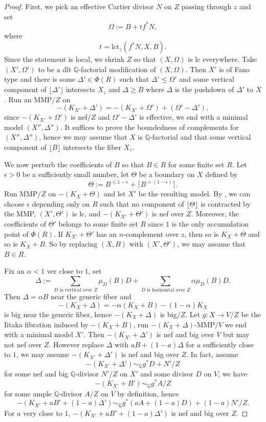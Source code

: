 \documentclass[letterpaper,reqno,12pt]{amsart}
\numberwithin{equation}{section}
\theoremstyle{plain}
\begin{document}
\begin{proof}
    First, we pick an effective Cartier divisor $N$ on $Z$ passing through $z$ and set \[\Omega:=B+tf^*N,\] where \[t=\text{lct}_z(f^*N,X,B).\]  Since the statement is local, we shrink $Z$ so that $(X,\Omega)$ is lc everywhere. Take $(X',\Omega')$ to be a dlt ${\mathbb Q}$-factorial modification of $(X,\Omega)$. Then $X'$ is of Fano type and there is some $\Delta'\in\Phi(R)$ such that $\Delta'\leq\Omega'$ and some vertical component of $\lfloor\Delta'\rfloor$ intersects $X_z$ and $\Delta\geq B$ where $\Delta$ is the pushdown of $\Delta'$ to $X$. Run an MMP$/Z$ on \[-(K_{X'}+\Delta')=-(K_{X'}+\Omega')+(\Omega'-\Delta'),\] since $-(K_{X'}+\Omega')$ is nef$/Z$ and $\Omega'-\Delta'$ is effective, we end with a minimal model $(X'',\Delta'')$. It suffices to prove the boundedness of complements for $(X'',\Delta'')$, hence we may assume that $X$ is ${\mathbb Q}$-factorial and that some vertical component of $\lfloor B\rfloor$ intersects the fiber $X_z$.
    
    We now perturb the coefficients of $B$ so that $B\in R$ for some finite set $R$. Let $\epsilon>0$ be a sufficiently small number, let $\Theta$ be a boundary on $X$ defined by
    \[\Theta:=B^{\leq 1-\epsilon}+\lceil B^{>(1-\epsilon)}\rceil.\]
    Run MMP$/Z$ on $-(K_X+\Theta)$ and let $X'$ be the resulting model. By , we can choose $\epsilon$ depending only on $R$ such that no component of $\lfloor\Theta\rfloor$ is contracted by the MMP, $(X',\Theta')$ is lc, and $-(K_{X'}+\Theta')$ is nef over $Z$. Moreover, the coefficients of $\Theta'$ belongs to some finite set $R$ since $1$ is the only accumulation point of $\Phi(R)$. If $K_{X'}+\Theta'$ has an $n$-complement over $z$, then so is $K_X+\Theta$ and so is $K_X+B$.  So by replacing $(X,B)$ with $(X',\Theta')$, we may assume that $B\in R$.  
    
    Fix an $\alpha<1$ ver close to $1$, set \[\Delta:=\sum
    \limits_{D\text{ is vertical over }Z}\mu_D(B)D+\sum\limits_{D\text{ is horizontal over }Z}\alpha\mu_D(B)D.\] Then $\Delta=\alpha B$ near the generic fiber and \[-(K_X+\Delta)=-\alpha(K_X+B)-(1-\alpha)K_X\] is big near the generic fiber, hence $-(K_X+\Delta)$ is big$/Z$. Let $g:X\to V/Z$ be the Iitaka fibration induced by $-(K_X+B)$, run $-(K_X+\Delta)$-MMP$/V$ we end with a minimal model $X'$. Then $-(K_{X'}+\Delta')$ is nef and big over $V$ but may not nef over $Z$. However replace $\Delta$ with $aB+(1-a)\Delta$ for $a$ sufficiently close to $1$, we may assume $-(K_{X'}+\Delta')$ is nef and big over $Z$. In fact, assume \[-(K_{X'}+\Delta')\sim_{\mathbb Q} g^*D+N'/Z\] for some nef and big ${\mathbb Q}$-divisor $N'/Z$ on $X'$ and some divisor $D$ on $V$, we have \[-(K_{X'}+B')\sim_{\mathbb Q}g^*A/Z\] for some ample ${\mathbb Q}$-divisor $A/Z$ on $V$ by definition, hence \[-(K_{X'}+aB'+(1-a)\Delta')\sim_{\mathbb Q}g^*(aA+(1-a)D)+(1-a)N'/Z.\] For $a$ very close to $1$, $-(K_{X'}+aB'+(1-a)\Delta')$ is nef and big over $Z$. 
    

\end{proof}
\end{document}
